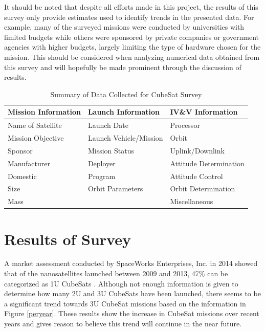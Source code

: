 \documentclass[11pt]{article}
\begin{document}
It should be noted that despite all efforts made in this project, the results of this survey only provide estimates used to identify trends in the presented data.  For example, many of the surveyed missions were conducted by universities with limited budgets while others were sponsored by private companies or government agencies with higher budgets, largely limiting the type of hardware chosen for the mission.  This should be considered when analyzing numerical data obtained from this survey and will hopefully be made prominent through the discussion of results. 
\begin{table}[h]
\centering
\caption{Summary of Data Collected for CubeSat Survey}
\label{summary}
\begin{tabular}{|l|l|l|}
\hline
\textbf{Mission Information} & \textbf{Launch Information} & \textbf{IV\&V Information} \\ \hline
Name of Satellite & Launch Date & Processor \\ \hline
Mission Objective & Launch Vehicle/Mission & Orbit \\ \hline
Sponsor & Mission Status & Uplink/Downlink \\ \hline
Manufacturer & Deployer & Attitude Determination \\ \hline
Domestic & Program & Attitude Control \\ \hline
Size & Orbit Parameters & Orbit Determination \\ \hline
Mass &  & Miscellaneous \\ \hline
\end{tabular}
\end{table}

\section{Results of Survey}
A market assessment conducted by SpaceWorks Enterprises, Inc. in 2014 showed that of the nanosatellites launched between 2009 and 2013, 47\% can be categorized as 1U CubeSats \cite{MarketAssessment}.  Although not enough information is given to determine how many 2U and 3U CubeSats have been launched, there seems to be a significant trend towards 3U CubeSat missions based on the information in Figure \ref{peryear}.  These results show the increase in CubeSat missions over recent years and gives reason to believe this trend will continue in the near future.
\end{document}
